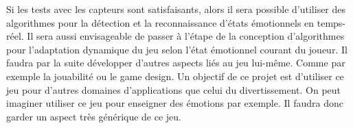 \documentclass[11pt]{article}
\begin{document}
	Si les tests avec les capteurs sont satisfaisants, alors il sera possible d'utiliser des algorithmes pour la détection et la reconnaissance d'états émotionnels en temps-réel.
	Il sera aussi envisageable de passer à l'étape de la conception d'algorithmes pour l'adaptation dynamique du jeu selon l'état émotionnel courant du joueur.
	Il faudra par la suite développer d'autres aspects liés au jeu lui-même.
	Comme par exemple la jouabilité ou le game design.
	Un objectif de ce projet est d'utiliser ce jeu pour d'autres domaines d'applications que celui du divertissement.
	On peut imaginer utiliser ce jeu pour enseigner des émotions par exemple.
	Il faudra donc garder un aspect très générique de ce jeu.


\newpage



\newpage
\appendix
\renewcommand{\appendixpagename}{Annexes}\appendixpage
%	
\end{document}
